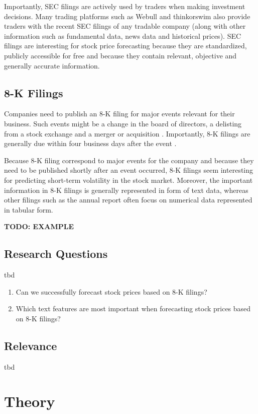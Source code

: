 \documentclass{article}
\begin{document}
	Importantly, SEC filings are actively used by traders when making investment decisions. Many trading platforms such as Webull and thinkorswim also provide traders with the recent SEC filings of any tradable company (along with other information such as fundamental data, news data and historical prices). SEC filings are interesting for stock price forecasting because they are standardized, publicly accessible for free and because they contain relevant, objective and generally accurate information.
	
	
	\subsection{8-K Filings}
	
	Companies need to publish an 8-K filing for major events relevant for their business. Such events might be a change in the board of directors, a delisting from a stock exchange and a merger or acquisition \cite{noauthor_sec.gov_nodate-1}. Importantly, 8-K filings are generally due within four business days after the event \cite{kenton_8-k_nodate}. 
	
	Because 8-K filing correspond to major events for the company and because they need to be published shortly after an event occurred, 8-K filings seem interesting for predicting short-term volatility in the stock market. Moreover, the important information in 8-K filings is generally represented in form of text data, whereas other filings such as the annual report often focus on numerical data represented in tabular form.
	
	\textbf{TODO: EXAMPLE}
	
	\subsection{Research Questions}
	tbd
	
	\begin{enumerate}
		\item Can we successfully forecast stock prices based on 8-K filings?
		\item Which text features are most important when forecasting stock prices based on 8-K filings?
	\end{enumerate}
	
	
	\subsection{Relevance}
	tbd
	

	\section{Theory}
	
\end{document}
